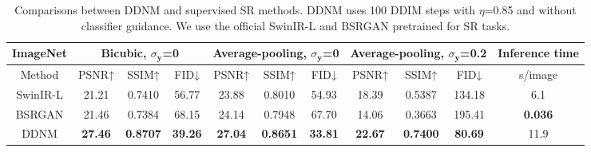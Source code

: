 \documentclass{article} \usepackage{iclr2023_conference,times}
\begin{document}
\begin{table*}[h]
\scriptsize
\centering
    \begin{tabular}{c | ccc | ccc| ccc|c}
    \hline
           \multicolumn{1}{c}{\rule{0pt}{8pt}\tiny\textbf{ImageNet}}&\multicolumn{3}{|c}{Bicubic, $\sigma_{\mathbf{y}}$=0} &\multicolumn{3}{|c}{Average-pooling, $\sigma_{\mathbf{y}}$=0}&\multicolumn{3}{|c}{Average-pooling, $\sigma_{\mathbf{y}}$=0.2}&\multicolumn{1}{|c}{Inference time}\\
        \hline
           \rule{0pt}{8pt}Method& PSNR↑&SSIM↑&FID↓ & PSNR↑&SSIM↑&FID↓ & PSNR↑&SSIM↑&FID↓&s/image \\
        \hline
            \rule{0pt}{8pt}{SwinIR-L} &21.21&0.7410&56.77 &23.88&0.8010&54.93 &18.39&0.5387&134.18&6.1\\
            \rule{0pt}{8pt}{BSRGAN} &21.46&0.7384&68.15 &24.14&0.7948&67.70 &14.06&0.3663&195.41&\textbf{0.036}\\
            \rule{0pt}{8pt}{DDNM} & \textbf{27.46}&\textbf{0.8707}&\textbf{39.26}& \textbf{27.04}&\textbf{0.8651}&\textbf{33.81}& \textbf{22.67}&\textbf{0.7400}&\textbf{80.69}&11.9\\
        \hline
    \end{tabular}
    \caption{Comparisons between DDNM and supervised SR methods. DDNM uses 100 DDIM steps with $\eta$=0.85 and without classifier guidance. We use the official SwinIR-L \citep{liang2021swinir} and BSRGAN \citep{zhang2021designing} pretrained for SR tasks.}
    \label{tb:ddnm supervised}
    \vspace{-0.5cm}
\end{table*}
\newpage
\end{document}
